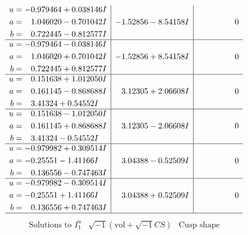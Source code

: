 \documentclass[1p]{elsarticle_modified}
\theoremstyle{definition}
\newcommand{\I}{\sqrt{-1}}
\begin{document}
$$\begin{array}{c|c|c}
\begin{aligned}
u &= -0.979464 + 0.038146 I \\
a &= \phantom{-}1.046020 - 0.701042 I \\
b &= \phantom{-}0.722445 - 0.812577 I\end{aligned}
 & -1.52856 - 8.54158 I & \phantom{-0.000000 } 0 \\ \hline\begin{aligned}
u &= -0.979464 - 0.038146 I \\
a &= \phantom{-}1.046020 + 0.701042 I \\
b &= \phantom{-}0.722445 + 0.812577 I\end{aligned}
 & -1.52856 + 8.54158 I & \phantom{-0.000000 } 0 \\ \hline\begin{aligned}
u &= \phantom{-}0.151638 + 1.012050 I \\
a &= \phantom{-}0.161145 - 0.868688 I \\
b &= \phantom{-}3.41324 + 0.54552 I\end{aligned}
 & \phantom{-}3.12305 + 2.06608 I & \phantom{-0.000000 } 0 \\ \hline\begin{aligned}
u &= \phantom{-}0.151638 - 1.012050 I \\
a &= \phantom{-}0.161145 + 0.868688 I \\
b &= \phantom{-}3.41324 - 0.54552 I\end{aligned}
 & \phantom{-}3.12305 - 2.06608 I & \phantom{-0.000000 } 0 \\ \hline\begin{aligned}
u &= -0.979982 + 0.309514 I \\
a &= -0.25551 - 1.41166 I \\
b &= \phantom{-}0.136556 - 0.747463 I\end{aligned}
 & \phantom{-}3.04388 - 0.52509 I & \phantom{-0.000000 } 0 \\ \hline\begin{aligned}
u &= -0.979982 - 0.309514 I \\
a &= -0.25551 + 1.41166 I \\
b &= \phantom{-}0.136556 + 0.747463 I\end{aligned}
 & \phantom{-}3.04388 + 0.52509 I & \phantom{-0.000000 } 0\\
 \hline 
 \end{array}$$\newpage$$\begin{array}{c|c|c}  
\text{Solutions to }I^u_{1}& \I (\text{vol} + \sqrt{-1}CS) & \text{Cusp shape}\\

\end{array}$$
\end{document}
